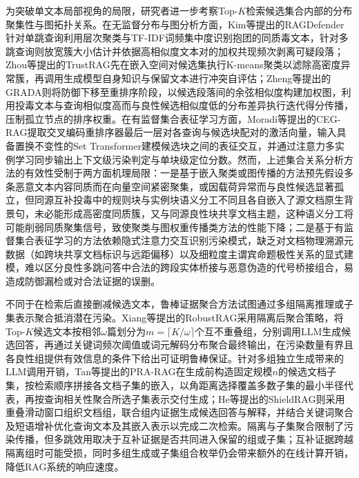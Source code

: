 为突破单文本局部视角的局限，研究者进一步考察Top-$K$检索候选集合内部的分布聚集性与图拓扑关系。在无监督分布与图分析方面，Kim等\cite{kim2025ragdefender}提出的RAGDefender针对单跳查询利用层次聚类与TF-IDF词频集中度识别抱团的同质毒文本，针对多跳查询则放宽簇大小估计并依据高相似度文本对的加权共现频次剥离可疑段落；Zhou等\cite{zhou2025trustrag}提出的TrustRAG先在嵌入空间对候选集执行K-means聚类以滤除高密度异常簇，再调用生成模型自身知识与保留文本进行冲突自评估；Zheng等\cite{zheng2025grada}提出的GRADA则将防御下移至重排序阶段，以候选段落间的余弦相似度构建加权图，利用投毒文本与查询相似度高而与良性候选相似度低的分布差异执行迭代得分传播，压制孤立节点的排序权重。在有监督集合表征学习方面，Moradi等\cite{cegrag2026}提出的CEG-RAG提取交叉编码重排序器最后一层对各查询与候选块配对的激活向量，输入具备置换不变性的Set Transformer建模候选块之间的表征交互，并通过注意力多实例学习同步输出上下文级污染判定与单块级定位分数。然而，上述集合关系分析方法的有效性受制于两方面机理局限：一是基于嵌入聚类或图传播的方法\cite{kim2025ragdefender,zhou2025trustrag,zheng2025grada}预先假设多条恶意文本内容同质而在向量空间紧密聚集，或因载荷异常而与良性候选显著孤立，但同源互补投毒中的规则块与实例块语义分工不同且各自嵌入了源文档原生背景句，未必能形成高密度同质簇，又与同源良性块共享文档主题，这种语义分工将可能削弱同质聚集信号，致使聚类与图权重传播类方法的性能下降；二是基于有监督集合表征学习的方法\cite{cegrag2026}依赖隐式注意力交互识别污染模式，缺乏对文档物理溯源元数据（如跨块共享文档标识与远距偏移）以及细粒度主谓宾命题极性关系的显式建模，难以区分良性多跳问答中合法的跨段实体桥接与恶意伪造的代号桥接组合，易造成防御漏检或对合法证据的误删。

不同于在检索后直接删减候选文本，鲁棒证据聚合方法试图通过多组隔离推理或子集表示聚合抵消潜在污染。Xiang等\cite{xiang2024certifiably}提出的RobustRAG采用隔离后聚合策略，将Top-$K$候选文本按相邻$\omega$篇划分为$m=\lceil K/\omega\rceil$个互不重叠组，分别调用LLM生成候选回答，再通过关键词频次阈值或词元解码分布聚合最终输出，在污染数量有界且各良性组提供有效信息的条件下给出可证明鲁棒保证。针对多组独立生成带来的LLM调用开销，Tan等\cite{tan2026prarag}提出的PRA-RAG在生成前构造固定规模$n$的候选文档子集，按检索顺序拼接各文档子集的嵌入，以角距离选择覆盖多数子集的最小半径代表，再按查询相关性聚合所选子集表示交付生成；He等\cite{he2026shieldrag}提出的ShieldRAG则采用重叠滑动窗口组织文档组，联合组内证据生成候选回答与解释，并结合关键词聚合及短语增补优化查询文本及其嵌入表示以完成二次检索。隔离与子集聚合限制了污染传播，但多跳效用取决于互补证据是否共同进入保留的组或子集；互补证据跨越隔离组时可能受损，同时多组生成或子集组合枚举仍会带来额外的在线计算开销，降低RAG系统的响应速度。

